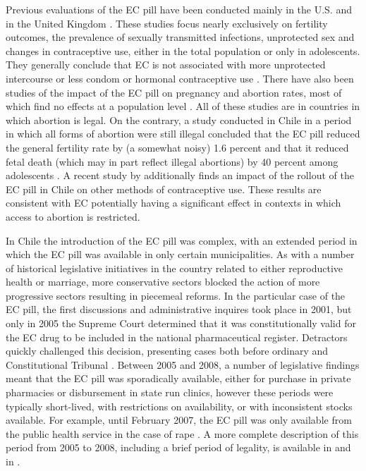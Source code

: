 \documentclass[12pt]{article}
\begin{document}
  Previous evaluations of the EC pill have been conducted mainly in the U.S. and in the United Kingdom \citep{Grossetal2014,Durrance2013,GirmaPatton2006,GirmaPatton2011,Mulligan2015}. These studies focus nearly exclusively on fertility outcomes, the prevalence of sexually transmitted infections, unprotected sex and changes in contraceptive use, either in the total population or only in adolescents. They generally conclude that EC is not associated with more unprotected intercourse or less condom or hormonal contraceptive use \citep{Goldetal2004}. There have also been studies of the impact of the EC pill on pregnancy and abortion rates, most of which find no effects at a population level \citep{Durrance2013,Grossetal2014,Raymondetal2007}. All of these studies are in countries in which abortion is legal.  On the contrary, a study conducted in Chile in a period in which all forms of abortion were still illegal concluded that the EC pill reduced the general fertility rate by (a somewhat noisy) 1.6 percent and that it reduced fetal death (which may in part reflect illegal abortions) by 40 percent among adolescents \citep{BentancorClarke2017}. A recent study by \citet{NuevoChiqueroPino2019} additionally finds an impact of the rollout of the EC pill in Chile on other methods of contraceptive use.  These results are consistent with EC potentially having a significant effect in contexts in which access to abortion is restricted.

  In Chile
  the introduction of the EC pill was complex, with an extended period in which the EC pill was available in only certain municipalities. 
  As with a number of historical legislative initiatives in the country related to either reproductive health or marriage, more conservative sectors blocked the action of more progressive sectors resulting in piecemeal reforms. In the particular case of the EC pill, the first discussions and administrative inquires took place in 2001, but only in 2005 the Supreme Court determined that it was constitutionally valid for the EC drug to be included in the national pharmaceutical register. Detractors quickly challenged this decision, presenting cases both before ordinary and Constitutional Tribunal \citep{CasasBecerra2008,Dides2009}.  Between 2005 and 2008, a number of legislative findings meant that the EC pill was sporadically available, either for purchase in private pharmacies or disbursement in state run clinics, however these periods were typically short-lived, with restrictions on availability, or with inconsistent stocks available. For example, until February 2007, the EC pill was only available from the public health service in the case of rape \citep{NuevoChiqueroPino2019}.  A more complete description of this period from 2005 to 2008, including a brief period of legality, is available in \citet{NuevoChiqueroPino2019} and in \citet[Appendix B]{BentancorClarke2017}.
\end{document}
